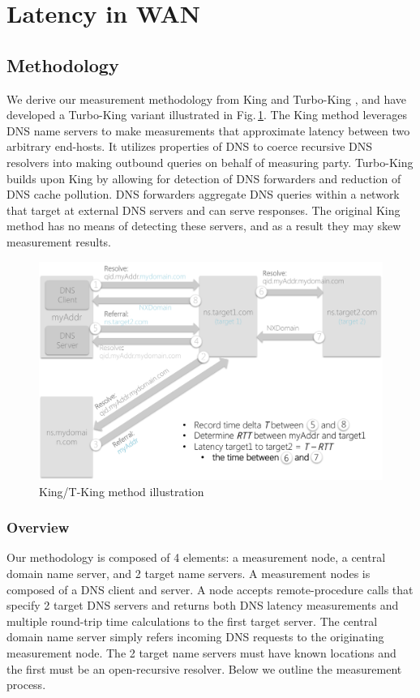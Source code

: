 \section{Latency in WAN}
\label{sec:latency-wan}

\subsection{Methodology}
\label{sec:methodology}

We derive our measurement methodology from King \cite{gummadi2002king} and Turbo-King \cite{leonard2008turbo}, and have developed a Turbo-King variant illustrated in Fig.\,\ref{fig:king_model}. The King method leverages DNS name servers to make measurements that approximate latency between two arbitrary end-hosts. It utilizes properties of DNS to coerce recursive DNS resolvers into making outbound queries on behalf of measuring party. Turbo-King builds upon King by allowing for detection of DNS forwarders and reduction of DNS cache pollution. DNS forwarders aggregate DNS queries within a network that target at external DNS servers and can serve responses. The original King method has no means of detecting these servers, and as a result they may skew measurement results.

\begin{figure}
  \centering
  \includegraphics[width=\linewidth]{../figs/king_model.pdf}
  \vspace{-1em}
  \caption{King/T-King method illustration}
  \label{fig:king_model}
\end{figure}

\subsubsection{Overview}
Our methodology is composed of 4 elements: a measurement node, a central domain name server, and 2 target name servers. A measurement nodes is composed of a DNS client and server. A node accepts remote-procedure calls that specify 2 target DNS servers and returns both DNS latency measurements and multiple round-trip time calculations to the first target server. The central domain name server simply refers incoming DNS requests to the originating measurement node. The 2 target name servers must have known locations and the first must be an open-recursive resolver. Below we outline the measurement process.

